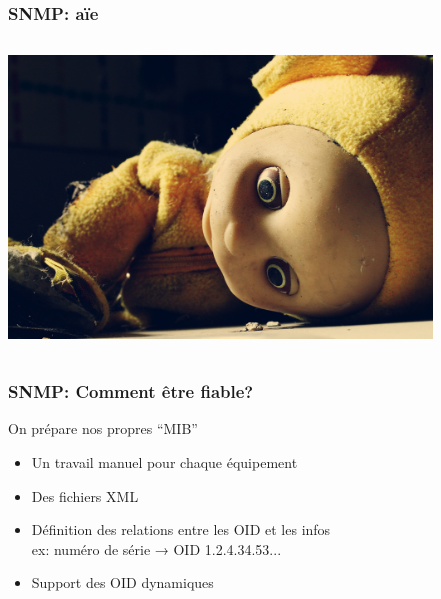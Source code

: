\documentclass{beamer}
\begin{document}
\begin{frame}
    \frametitle{SNMP: aïe}

 \begin{columns}
 \begin{column}{0.35\textwidth}
         \includegraphics[height=7.5cm]{./pics/dead-teletubbies.jpg}
 \end{column}
 \begin{column}{0.65\textwidth}

 \end{column}
\end{columns}
\end{frame}



\begin{frame}
    \frametitle{SNMP: Comment être fiable?}

    \begin{block}{On prépare nos propres “MIB”}
    \begin{itemize}
    \item Un travail manuel pour chaque équipement
    \item Des fichiers XML
    \item Définition des relations entre les OID et les infos \\
        \small{ex: numéro de série → OID 1.2.4.34.53...}
    \item Support des OID dynamiques
    \end{itemize}
    \end{block}


\end{frame}
\end{document}
